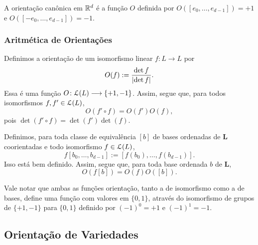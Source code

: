 A orientação canônica em $\mathbb{R}^d$ é a função $O$ definida por $O([e_0,\ldots,e_{d-1}]) = +1$ e $O([-e_0,\ldots,e_{d-1}]) = -1$.

\subsubsection{Aritmética de Orientações}

Definimos a orientação de um isomorfismo linear $f\colon L \to L$ por
	\begin{equation*}
	O(f) := \frac{\det f}{\left\vert{\det f}\right\vert}.
	\end{equation*}
Essa é uma função $O\colon \mathcal{L}(L) \longrightarrow \{+1,-1\}$. Assim, segue que, para todos isomorfismos $f,f' \in \mathcal{L}(L)$,
	\begin{equation*}
	O(f' \circ f) = O(f')O(f),
	\end{equation*}
pois $\det(f' \circ f) = \det(f')\det(f)$.

Definimos, para toda classe de equivalência $[b]$ de bases ordenadas de $\bm L$ coorientadas e todo isomorfismo $f \in \mathcal{L}(L)$,
	\begin{equation*}
	f[b_0, \ldots, b_{d-1}] := [f(b_0), \ldots, f(b_{d-1})].
	\end{equation*}
Isso está bem definido. Assim, segue que, para toda base ordenada $b$ de $\bm L$,
	\begin{equation*}
	O(f[b]) = O(f)O([b]).
	\end{equation*}

Vale notar que ambas as funções orientação, tanto a de isomorfismo como a de bases, define uma função com valores em $\{0,1\}$, através do isomorfismo de grupos de $\{+1,-1\}$ para $\{0,1\}$ definido por $(-1)^0 = +1$ e $(-1)^1 = -1$.

\subsection{Orientação de Variedades}


